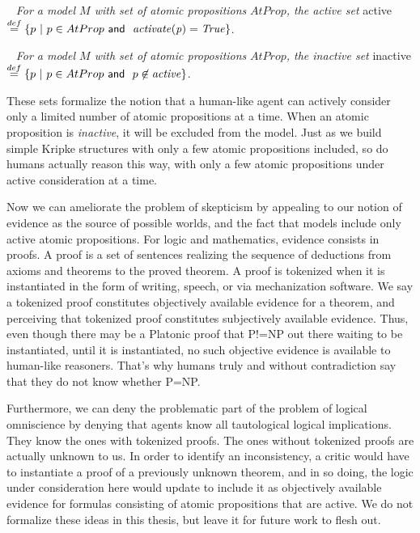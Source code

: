 \begin{definition}~\label{active_set}
	\emph{For a model $M$ with set of atomic propositions} $AtProp$\emph{, the active set} active  $\stackrel{def}{=} \{p\  |\  p \in AtProp \textsf{\ and \ } \mathit{activate(p)} = \mathit{True}\}$.
\end{definition}

\begin{definition}~\label{inactive_set}
	\emph{For a model $M$ with set of atomic propositions} $AtProp$\emph{, the inactive set} inactive  $\stackrel{def}{=} \{p\  |\  p \in AtProp \textsf{\ and \ } p\not\in \mathit{active}\}$.
\end{definition}

These sets formalize the notion that a human-like agent can actively consider only a limited number of atomic propositions at a time. When an atomic proposition is \emph{inactive}, it will be excluded from the model. Just as we build simple Kripke structures with only a few atomic propositions included, so do humans actually reason this way, with only a few atomic propositions under active consideration at a time. 

Now we can ameliorate the problem of skepticism by appealing to our notion of evidence as the source of possible worlds, and the fact that models include only active atomic propositions. For logic and mathematics, evidence consists in proofs. A proof is a set of sentences realizing the sequence of deductions from axioms and theorems to the proved theorem. A proof is tokenized when it is instantiated in the form of writing, speech, or via mechanization software. We say a tokenized proof constitutes objectively available evidence for a theorem, and perceiving that tokenized proof constitutes subjectively available evidence. Thus, even though there may be a Platonic proof that P!=NP out there waiting to be instantiated, until it is instantiated, no such objective evidence is available to human-like reasoners. That's why humans truly and without contradiction say that they do not know whether P=NP.

Furthermore, we can deny the problematic part of the problem of logical omniscience by denying that agents know all tautological logical implications. They know the ones with tokenized proofs. The ones without tokenized proofs are actually unknown to us. In order to identify an inconsistency, a critic would have to instantiate a proof of a previously unknown theorem, and in so doing, the logic under consideration here would update to include it as objectively available evidence for formulas consisting of atomic propositions that are active. We do not formalize these ideas in this thesis, but leave it for future work to flesh out.

